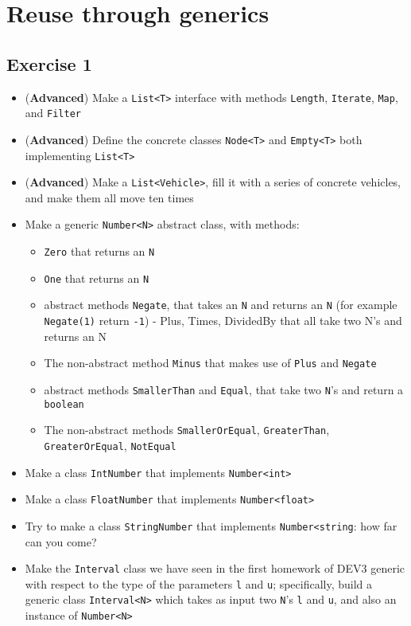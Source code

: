\chapter{Reuse through generics}
    \section{Exercise 1}
        \begin{itemize}
            \item (\textbf{Advanced}) Make a \texttt{List<T>} interface with methods \texttt{Length}, \texttt{Iterate}, \texttt{Map}, and \texttt{Filter}
            \item (\textbf{Advanced}) Define the concrete classes \texttt{Node<T>} and \texttt{Empty<T>} both implementing \texttt{List<T>}
            \item (\textbf{Advanced}) Make a \texttt{List<Vehicle>}, fill it with a series of concrete vehicles, and make them all move ten times
            \item Make a generic \texttt{Number<N>} abstract class, with methods:
            \begin{itemize}
                \item \texttt{Zero} that returns an \texttt{N}
                \item \texttt{One} that returns an \texttt{N}
                \item abstract methods \texttt{Negate}, that takes an \texttt{N} and returns an \texttt{N} (for example \texttt{Negate(1)} return \texttt{-1})
                - Plus, Times, DividedBy that all take two N's and returns an N
                \item The non-abstract method \texttt{Minus} that makes use of \texttt{Plus} and \texttt{Negate}
                \item abstract methods \texttt{SmallerThan} and \texttt{Equal}, that take two \texttt{N}'s and return a \texttt{boolean}
                \item The non-abstract methods \texttt{SmallerOrEqual}, \texttt{GreaterThan}, \texttt{GreaterOrEqual}, \texttt{NotEqual}
            \end{itemize}

            \item Make a class \texttt{IntNumber} that implements \texttt{Number<int>}
            \item Make a class \texttt{FloatNumber} that implements \texttt{Number<float>}
            \item Try to make a class \texttt{StringNumber} that implements \texttt{Number<string}: how far can you come?

            \item Make the \texttt{Interval} class we have seen in the first homework of DEV3 generic with respect to the type of the parameters \texttt{l} and \texttt{u}; specifically, build a generic class \texttt{Interval<N>} which takes as input two \texttt{N}'s \texttt{l} and \texttt{u}, and also an instance of \texttt{Number<N>}
        \end{itemize}
